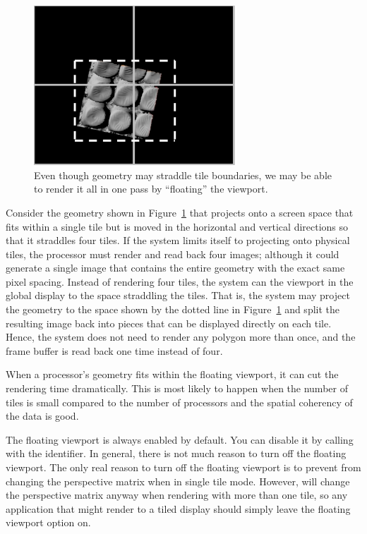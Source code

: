 \begin{figure}
  \centering
  \includegraphics[width=3in]{images/FloatingViewport}
  \caption{Even though geometry may straddle tile boundaries, we may be
    able to render it all in one pass by ``floating'' the viewport.}
  \label{fig:FloatingViewport}
\end{figure}

Consider the geometry shown in Figure~\ref{fig:FloatingViewport} that
projects onto a screen space that fits within a single tile but is moved in
the horizontal and vertical directions so that it straddles four tiles.  If
the system limits itself to projecting onto physical tiles, the processor
must render and read back four images; although it could generate a single
image that contains the entire geometry with the exact same pixel spacing.
Instead of rendering four tiles, the system can  the
viewport in the global display to the space straddling the tiles.  That is,
the system may project the geometry to the space shown by the dotted line
in Figure~\ref{fig:FloatingViewport} and split the resulting image back
into pieces that can be displayed directly on each tile.  Hence, the system
does not need to render any polygon more than once, and the frame buffer is
read back one time instead of four.

When a processor’s geometry fits within the floating viewport, it can cut
the rendering time dramatically.  This is most likely to happen when the
number of tiles is small compared to the number of processors and the
spatial coherency of the data is good.

The floating viewport is always enabled by default.  You can disable it by
calling  with the 
identifier.  In general, there is not much reason to turn off the floating
viewport.  The only real reason to turn off the floating viewport is to
prevent \IceT from changing the perspective matrix when in single tile
mode.  However, \IceT will change the perspective matrix anyway when
rendering with more than one tile, so any application that might render to
a tiled display should simply leave the floating viewport option on.

